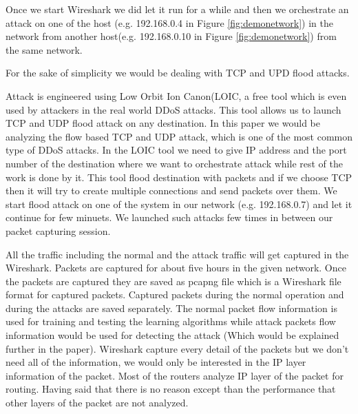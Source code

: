 \documentclass[10pt,oneside,a4paper]{article}
\begin{document}
Once we start Wireshark we did let it run for a while and then we orchestrate an attack on one of the host (e.g. 192.168.0.4 in Figure \ref{fig:demonetwork}) in the network from another host(e.g. 192.168.0.10 in Figure \ref{fig:demonetwork}) from the same network.

For the sake of simplicity we would be dealing with TCP and UPD flood attacks.

Attack is engineered using Low Orbit Ion Canon(LOIC, a free tool which is even used by attackers in the real world DDoS attacks. This tool allows us to launch TCP and UDP flood attack on any destination. In this paper we would be analyzing the flow based TCP and UDP attack, which is one of the most common type of DDoS attacks.
In the LOIC tool we need to give IP address and the port number of the destination where we want to orchestrate attack while rest of the work is done by it. This tool flood destination with packets and if we choose TCP then it will try to create multiple connections and send packets over them. We start flood attack on one of the system in our network (e.g. 192.168.0.7) and let it continue for few minuets. We launched such attacks few times in between our packet capturing session.

All the traffic including the normal and the attack traffic will get captured in the Wireshark. Packets are captured for about five hours in the given network. Once the packets are captured they are saved as pcapng file which is a Wireshark file format for captured packets. Captured packets during the normal operation and during the attacks are saved separately. The normal packet flow information is used for training and testing the learning algorithms while attack packets flow information would be used for detecting the attack (Which would be explained further in the paper). Wireshark capture every detail of the packets but we don't need all of the information, we would only be interested in the IP layer information of the packet. Most of the routers analyze IP layer of the packet for routing. Having said that there is no reason except than the performance that other layers of the packet are not analyzed.\par
\end{document}
